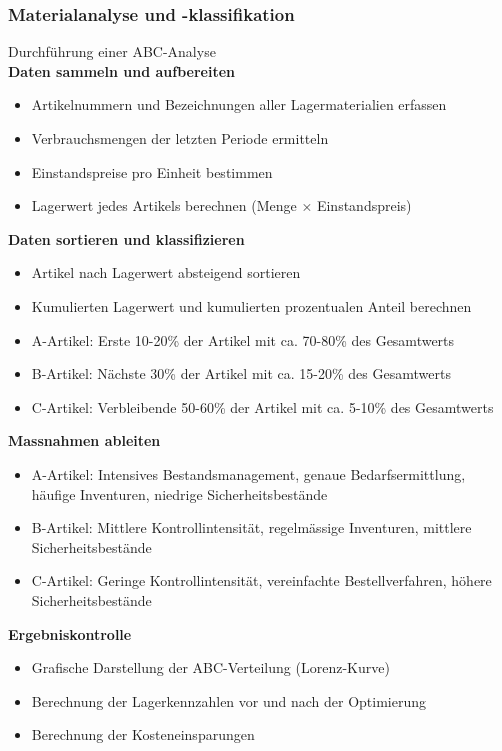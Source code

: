\subsubsection{Materialanalyse und -klassifikation}


\begin{KR}{Durchführung einer ABC-Analyse}\\
\textbf{Daten sammeln und aufbereiten}
\begin{itemize}
    \item Artikelnummern und Bezeichnungen aller Lagermaterialien erfassen
    \item Verbrauchsmengen der letzten Periode ermitteln
    \item Einstandspreise pro Einheit bestimmen
    \item Lagerwert jedes Artikels berechnen (Menge × Einstandspreis)
\end{itemize}

\textbf{Daten sortieren und klassifizieren}
\begin{itemize}
    \item Artikel nach Lagerwert absteigend sortieren
    \item Kumulierten Lagerwert und kumulierten prozentualen Anteil berechnen
    \item A-Artikel: Erste 10-20\% der Artikel mit ca. 70-80\% des Gesamtwerts
    \item B-Artikel: Nächste 30\% der Artikel mit ca. 15-20\% des Gesamtwerts
    \item C-Artikel: Verbleibende 50-60\% der Artikel mit ca. 5-10\% des Gesamtwerts
\end{itemize}

\textbf{Massnahmen ableiten}
\begin{itemize}
    \item A-Artikel: Intensives Bestandsmanagement, genaue Bedarfsermittlung, häufige Inventuren, niedrige Sicherheitsbestände
    \item B-Artikel: Mittlere Kontrollintensität, regelmässige Inventuren, mittlere Sicherheitsbestände
    \item C-Artikel: Geringe Kontrollintensität, vereinfachte Bestellverfahren, höhere Sicherheitsbestände
\end{itemize}

\textbf{Ergebniskontrolle}
\begin{itemize}
    \item Grafische Darstellung der ABC-Verteilung (Lorenz-Kurve)
    \item Berechnung der Lagerkennzahlen vor und nach der Optimierung
    \item Berechnung der Kosteneinsparungen
\end{itemize}
\end{KR}

